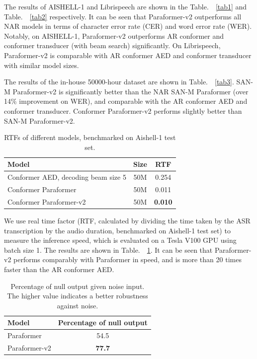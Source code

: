 \documentclass[runningheads]{llncs}
\begin{document}
The results of AISHELL-1 and Librispeech are shown in the Table.~~\ref{tab1} and Table.~~\ref{tab2} respectively. It can be seen that Paraformer-v2 outperforms all NAR models in terms of character error rate (CER) and word error rate (WER). Notably, on AISHELL-1, Paraformer-v2 outperforms AR conformer and conformer transducer (with beam search) significantly. On Librispeech, Paraformer-v2 is comparable with AR conformer AED and conformer transducer with similar model sizes. 

The results of the in-house 50000-hour dataset are shown in Table.~~\ref{tab3}. SAN-M Paraformer-v2 is significantly better than the NAR SAN-M Paraformer (over 14\% improvement on WER), and comparable with the AR conformer AED and conformer transducer. Conformer Paraformer-v2 performs slightly better than SAN-M Paraformer-v2.
\begin{table}
\caption{RTFs of different models, benchmarked on Aishell-1 test set.}
\centering
\begin{tabular}{l|c|c}
\hline
\textbf{Model} & \textbf{Size} & \textbf{RTF} \\
\hline
Conformer AED, decoding beam size 5 & 50M & 0.254 \\
Conformer Paraformer & 50M &  0.011 \\
Conformer Paraformer-v2 & 50M &  \textbf{0.010} \\
\hline
\end{tabular}
\label{tab4}
\vspace{-0.25cm}
\end{table}

We use real time factor (RTF, calculated by dividing the time taken by the ASR transcription by the audio duration, benchmarked on Aishell-1 test set) to measure the inference speed, which is evaluated on a Tesla V100 GPU using batch size 1. The results are shown in Table.~~\ref{tab4}. It can be seen that Paraformer-v2 performs comparably with Paraformer in speed, and is more than 20 times faster than the AR conformer AED.
\begin{table}
\caption{Percentage of null output given noise input. The higher value indicates a better robustness against noise.}
\centering
\begin{tabular}{l|c}
\hline
\textbf{Model} &   \textbf{Percentage of null output} \\
\hline
Paraformer & 54.5 \\
Paraformer-v2 & \textbf{77.7}  \\
\hline
\end{tabular}
\label{tab5}
\vspace{-0.25cm}
\end{table}
\end{document}

